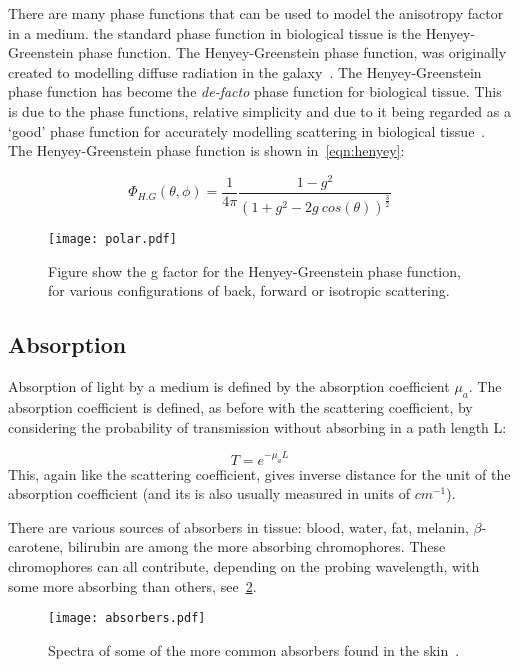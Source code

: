 There are many phase functions that can be used to model the anisotropy factor in a medium. the standard phase function in biological tissue is the Henyey-Greenstein phase function. The Henyey-Greenstein phase function, was originally created to modelling diffuse radiation in the galaxy~\cite{lister2012optical,henyey1941diffuse}. The Henyey-Greenstein phase function has become the \textit{de-facto} phase function for biological tissue. This is due to the phase functions, relative simplicity and due to it being regarded as a `good' phase function for accurately modelling scattering in biological tissue~\cite{jacques1987angular}.
The Henyey-Greenstein phase function is shown in~\cref{eqn:henyey}:

\begin{equation}
	\Phi_{H.G}(\theta,\phi)=\frac{1}{4\pi}\frac{1-g^2}{(1+g^2-2g\ cos(\theta))^{\tfrac{3}{2}}}
	\label{eqn:henyey}
\end{equation}

\begin{figure}
	\centering
	\texttt{[image: polar.pdf]}
	\caption{Figure show the g factor for the Henyey-Greenstein phase function, for various configurations of back, forward or isotropic scattering.}
	\label{fig:henyey}
\end{figure}

\subsection{Absorption}\label{sec:absor}

Absorption of light by a medium is defined by the absorption coefficient $\mu_a$. The absorption coefficient is defined, as before with the scattering coefficient, by considering the probability of transmission without absorbing in a path length L:

\begin{equation}
	T=e^{-\mu_aL}
\end{equation}
This, again like the scattering coefficient, gives inverse distance for the unit of the absorption coefficient (and its is also usually measured in units of $cm^{-1}$).

There are various sources of absorbers in tissue: blood, water, fat, melanin, $\beta$-carotene, bilirubin are among the more absorbing chromophores. These chromophores can all contribute, depending on the probing wavelength, with some more absorbing than others, see~\cref{fig:absorb}. 

\begin{figure}
	\centering
	\texttt{[image: absorbers.pdf]}
	\caption{Spectra of some of the more common absorbers found in the skin~\cite{dixon2005photochemcad,photoprahl2017,segelstein1981complex,pope1997absorption,jacques2013optical,van2004determination,saidi1992transcutaneous,iglesias2015biophysically,bashkatov2011optical,sarna2006physical}.}
	\label{fig:absorb}
\end{figure}


